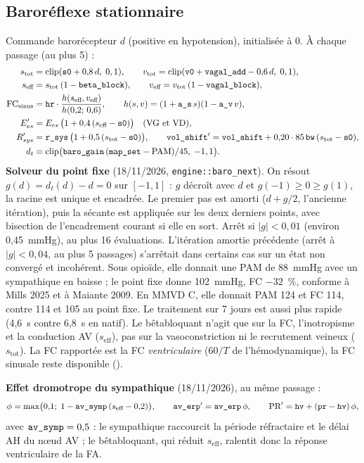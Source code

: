 \documentclass[10pt,a4paper]{article}
\newcommand{\cmd}[1]{\texttt{#1}}
\newcommand{\vp}[1]{\text{\texttt{\detokenize{#1}}}}
\begin{document}
\subsection{Baroréflexe stationnaire}
Commande barorécepteur $d$ (positive en hypotension), initialisée à 0. À chaque passage (au plus 5) :
\begin{align}
s_\text{tot} &= \mathrm{clip}(\vp{s0} + 0{,}8\,d,\;0, 1), \qquad v_\text{tot} = \mathrm{clip}(\vp{v0} + \vp{vagal_add} - 0{,}6\,d,\;0, 1),\\
s_\text{eff} &= s_\text{tot}\,(1 - \vp{beta_block}), \qquad v_\text{eff} = v_\text{tot}\,(1 - \vp{vagal_block}),\\
\text{FC}_\text{sinus} &= \vp{hr}\cdot\frac{h(s_\text{eff}, v_\text{eff})}{h(0{,}2;\,0{,}6)}, \qquad h(s, v) = (1 + \vp{a_s}\,s)(1 - \vp{a_v}\,v),\\
E_{es}' &= E_{es}\,\bigl(1 + 0{,}4\,(s_\text{eff} - \vp{s0})\bigr)\quad\text{(VG et VD)},\\
R_{sys}' &= \vp{r_sys}\,\bigl(1 + 0{,}5\,(s_\text{tot} - \vp{s0})\bigr), \qquad
\vp{vol_shift}' = \vp{vol_shift} + 0{,}20\cdot 85\,\vp{bw}\,(s_\text{tot} - \vp{s0}),\\
d_t &= \mathrm{clip}\bigl(\vp{baro_gain}\,(\vp{map_set} - \text{PAM})/45,\;-1, 1\bigr).
\end{align}
\textbf{Solveur du point fixe} (18/11/2026, \cmd{engine::baro\_next}). On résout $g(d) = d_t(d) - d = 0$ sur $[-1, 1]$ : $g$ décroît avec $d$ et $g(-1) \ge 0 \ge g(1)$, la racine est unique et encadrée. Le premier pas est amorti ($d + g/2$, l'ancienne itération), puis la sécante est appliquée sur les deux derniers points, avec bisection de l'encadrement courant si elle en sort. Arrêt si $|g| < 0{,}01$ (environ 0,45~mmHg), au plus 16 évaluations. L'itération amortie précédente (arrêt à $|g| < 0{,}04$, au plus 5 passages) s'arrêtait dans certains cas sur un état non convergé et incohérent. Sous opioïde, elle donnait une PAM de 88~mmHg avec un sympathique en baisse ; le point fixe donne 102~mmHg, FC $-32$~\%, conforme à Mills 2025 et à Maiante 2009. En MMVD C, elle donnait PAM 124 et FC 114, contre 114 et 105 au point fixe. Le traitement sur 7 jours est aussi plus rapide (4,6~s contre 6,8~s en natif). Le bêtabloquant n'agit que sur la FC, l'inotropisme et la conduction AV ($s_\text{eff}$), pas sur la vasoconstriction ni le recrutement veineux ($s_\text{tot}$). La FC rapportée est la FC \emph{ventriculaire} ($60/T$ de l'hémodynamique), la FC sinusale reste disponible (\vp{sinus_hr}).

\textbf{Effet dromotrope du sympathique} (18/11/2026), au même passage :
\begin{equation}
\phi = \max\bigl(0{,}1;\;1 - \vp{av_symp}\,(s_\text{eff} - 0{,}2)\bigr),\qquad
\vp{av_erp}' = \vp{av_erp}\,\phi,\qquad \text{PR}' = \vp{hv} + (\vp{pr} - \vp{hv})\,\phi,
\end{equation}
avec $\vp{av_symp} = 0{,}5$ : le sympathique raccourcit la période réfractaire et le délai AH du nœud AV ; le bêtabloquant, qui réduit $s_\text{eff}$, ralentit donc la réponse ventriculaire de la FA.
\end{document}

